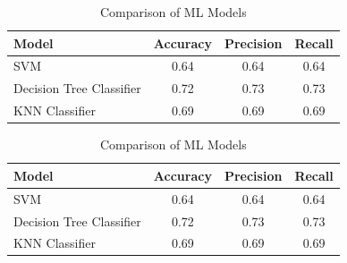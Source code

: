 \begin{table}[htbp]
    \centering
    \caption{Comparison of ML Models}
    \label{tab:ml_comparison}
    \begin{tabular}{lccc}
        \hline
        \textbf{Model} & \textbf{Accuracy} & \textbf{Precision} & \textbf{Recall} \\
        \hline
        SVM & 0.64 & 0.64 & 0.64 \\
        Decision Tree Classifier & 0.72 & 0.73 & 0.73 \\
        KNN Classifier & 0.69 & 0.69 & 0.69 \\
        \hline
    \end{tabular}
\end{table}

\begin{table}[htbp]
    \centering
    \caption{Comparison of ML Models}
    \label{tab:ml_comparison}
    \begin{tabular}{lccc}
        \hline
        \textbf{Model} & \textbf{Accuracy} & \textbf{Precision} & \textbf{Recall} \\
        \hline
        SVM & 0.64 & 0.64 & 0.64 \\
        Decision Tree Classifier & 0.72 & 0.73 & 0.73 \\
        KNN Classifier & 0.69 & 0.69 & 0.69 \\
        \hline
    \end{tabular}
\end{table}